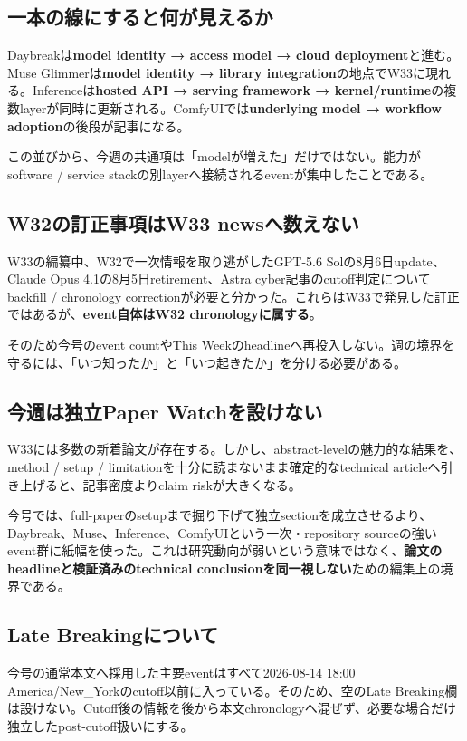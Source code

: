 \subsection*{一本の線にすると何が見えるか}

Daybreakは\textbf{model identity → access model → cloud deployment}と進む。Muse Glimmerは\textbf{model identity → library integration}の地点でW33に現れる。Inferenceは\textbf{hosted API → serving framework → kernel/runtime}の複数layerが同時に更新される。ComfyUIでは\textbf{underlying model → workflow adoption}の後段が記事になる。

この並びから、今週の共通項は「modelが増えた」だけではない。能力がsoftware / service stackの別layerへ接続されるeventが集中したことである。

\subsection*{W32の訂正事項はW33 newsへ数えない}

W33の編纂中、W32で一次情報を取り逃がしたGPT-5.6 Solの8月6日update、Claude Opus 4.1の8月5日retirement、Astra cyber記事のcutoff判定についてbackfill / chronology correctionが必要と分かった\cite{w32-backfill-errata}。これらはW33で発見した訂正ではあるが、\textbf{event自体はW32 chronologyに属する}。

そのため今号のevent countやThis Weekのheadlineへ再投入しない。週の境界を守るには、「いつ知ったか」と「いつ起きたか」を分ける必要がある。

\subsection*{今週は独立Paper Watchを設けない}

W33には多数の新着論文が存在する。しかし、abstract-levelの魅力的な結果を、method / setup / limitationを十分に読まないまま確定的なtechnical articleへ引き上げると、記事密度よりclaim riskが大きくなる。

今号では、full-paperのsetupまで掘り下げて独立sectionを成立させるより、Daybreak、Muse、Inference、ComfyUIという一次・repository sourceの強いevent群に紙幅を使った。これは研究動向が弱いという意味ではなく、\textbf{論文のheadlineと検証済みのtechnical conclusionを同一視しない}ための編集上の境界である。

\subsection*{Late Breakingについて}

今号の通常本文へ採用した主要eventはすべて2026-08-14 18:00 America/New\_Yorkのcutoff以前に入っている。そのため、空のLate Breaking欄は設けない。Cutoff後の情報を後から本文chronologyへ混ぜず、必要な場合だけ独立したpost-cutoff扱いにする。
